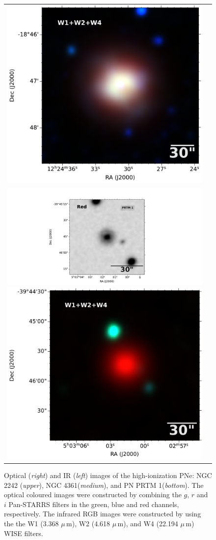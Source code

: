 \documentclass[fleqn,usenatbib]{mnras}
\begin{document}
\begin{figure}
\begin{tabular}{l l}
\includegraphics[width=0.5\linewidth]{Figs/1855m182_ac51-w4-int-3_ra186.12812938647002_dec-18.78487981564_asec200.000-421-RGB}\\
\includegraphics[width=0.535\linewidth, trim=280 10 330 10, clip]{Figs/dss_search_red.pdf}
\includegraphics[width=0.47\linewidth, trim=58 0 0 0]{Figs/0754m394_ac51-w4-int-3_ra75.75721626934_dec-39.76236833917_asec150.000-421-RGB.pdf}\\

\end{tabular}  
  \caption{Optical (\textit{right}) and IR (\textit{left}) images of the 
    high-ionization PNe: NGC 2242 (\textit{upper}), NGC 4361(\textit{medium}), and
    PN PRTM 1(\textit{bottom}).
    The optical coloured images were constructed by combining the
    $g$, $r$ and $i$ Pan-STARRS filters in the green, blue and red channels, respectively.
    The infrared RGB images were constructed by using the the W1 (3.368 $\mu$\,m), W2
    (4.618 $\mu$\,m), and W4 (22.194 $\mu$\,m) WISE filters.} 
  \label{fig:images-known}
\end{figure}
\end{document}

